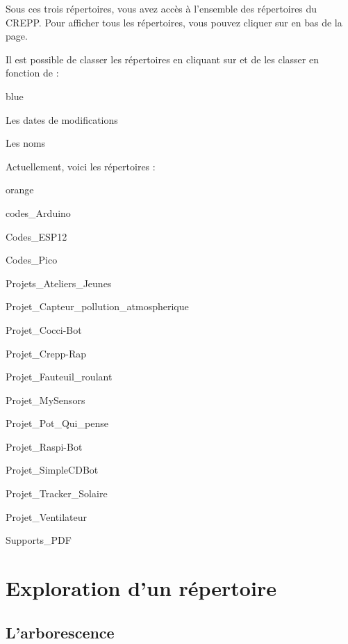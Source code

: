 {Sous ces trois répertoires, vous avez accès à l'ensemble des répertoires du CREPP. Pour afficher tous les répertoires, vous pouvez cliquer 
sur  en bas de la page.


Il est possible de classer les répertoires en cliquant sur  et de les classer en fonction de :

\begin{items}{blue}{\Bullet}
    \item Les dates de modifications
    \item Les noms
\end{items}


Actuellement, voici les répertoires : 

\begin{items}{orange}{\faBookmark} 
\item codes\_Arduino
\item Codes\_ESP12
\item Codes\_Pico
\item Projets\_Ateliers\_Jeunes
\item Projet\_Capteur\_pollution\_atmospherique
\item Projet\_Cocci-Bot
\item Projet\_Crepp-Rap
\item Projet\_Fauteuil\_roulant
\item Projet\_MySensors
\item Projet\_Pot\_Qui\_pense
\item Projet\_Raspi-Bot
\item Projet\_SimpleCDBot
\item Projet\_Tracker\_Solaire
\item Projet\_Ventilateur
\item Supports\_PDF 
\end{items}


\section{Exploration d'un répertoire}

\subsection{L'arborescence}

}
